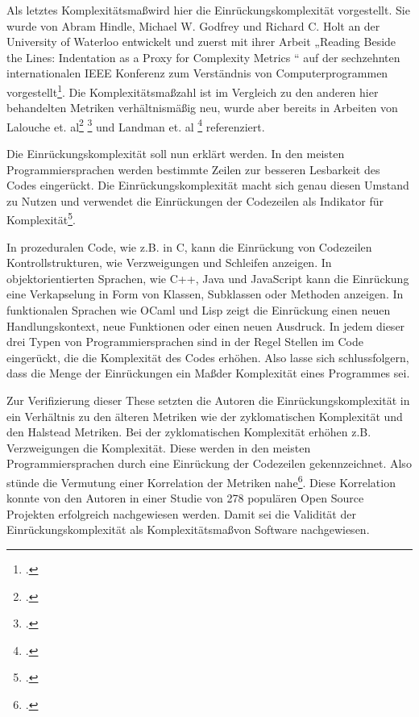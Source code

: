 Als letztes Komplexitätsma\ss  wird hier die Einrückungskomplexität
vorgestellt. Sie wurde von Abram Hindle, Michael W. Godfrey und Richard
C. Holt an der University of Waterloo entwickelt und zuerst mit ihrer
Arbeit „Reading Beside the Lines: Indentation as a Proxy for Complexity
Metrics `` auf der sechzehnten internationalen IEEE Konferenz zum
Verständnis von Computerprogrammen vorgestellt\footcite[Vgl. ][S. 1]{hindleReadingLinesIndentation2008}. Die Komplexitätsma\ss zahl ist im Vergleich zu den anderen hier
behandelten Metriken verhältnismä\ss ig neu, wurde aber bereits in Arbeiten
von Lalouche et. al\footcite[Vgl. ][S. 10]{gilWhenSoftwareComplexity2016}
\footcite[Vgl. ][S. 7]{gilCorrelationSizeMetric2017} und Landman et. al
\footcite[Vgl. ][S. 6]{landmanEmpiricalAnalysisRelationship2016} referenziert.

Die Einrückungskomplexität soll nun erklärt werden. In den meisten
Programmiersprachen werden bestimmte Zeilen zur besseren Lesbarkeit des
Codes eingerückt. Die Einrückungskomplexität macht sich genau diesen
Umstand zu Nutzen und verwendet die Einrückungen der Codezeilen als
Indikator für Komplexität\footcite[Vgl. ][S. 1]{hindleReadingLinesUsing2009}.

In prozeduralen Code, wie z.B. in C, kann die Einrückung von Codezeilen
Kontrollstrukturen, wie Verzweigungen und Schleifen anzeigen. In
objektorientierten Sprachen, wie C++, Java und JavaScript kann die
Einrückung eine Verkapselung in Form von Klassen, Subklassen oder
Methoden anzeigen. In funktionalen Sprachen wie OCaml und Lisp zeigt die
Einrückung einen neuen Handlungskontext, neue Funktionen oder einen
neuen Ausdruck. In jedem dieser drei Typen von
Programmiersprachen sind in der Regel Stellen im Code eingerückt, die
die Komplexität des Codes erhöhen. Also lasse sich schlussfolgern, dass
die Menge der Einrückungen ein Ma\ss  der Komplexität eines Programmes sei.

Zur Verifizierung dieser These setzten die Autoren die
Einrückungskomplexität in ein Verhältnis zu den älteren Metriken wie der
zyklomatischen Komplexität und den Halstead Metriken. Bei der
zyklomatischen Komplexität erhöhen z.B. Verzweigungen die Komplexität.
Diese werden in den meisten Programmiersprachen durch eine Einrückung
der Codezeilen gekennzeichnet. Also stünde die Vermutung einer
Korrelation der Metriken nahe\footcite[Vgl. ][S. 2]{hindleReadingLinesUsing2009}.
Diese Korrelation konnte von den Autoren in einer Studie von 278
populären Open Source Projekten erfolgreich nachgewiesen
werden. Damit sei die Validität der
Einrückungskomplexität als Komplexitätsma\ss  von Software nachgewiesen.

